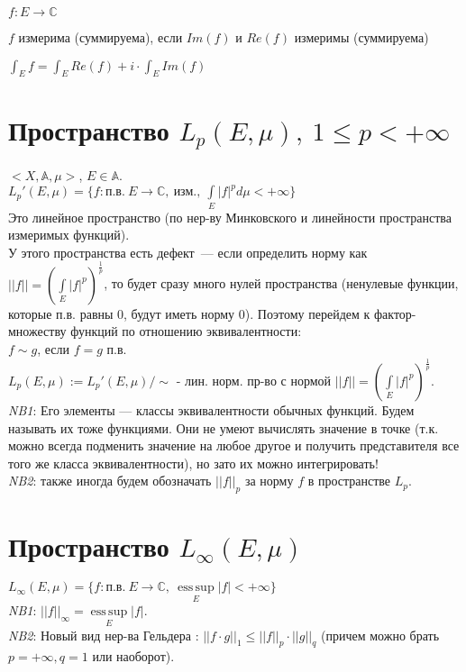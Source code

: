 \documentclass[paper=a4, fontsize=14pt]{report}
\DeclareMathOperator*{\esssup}{ess\, sup}
\begin{document}
$f: E \rightarrow \mathds{C}$

$f$ измерима (суммируема), если $Im(f)$ и $Re(f)$ измеримы (суммируема)

$\int_E f =\int_E Re(f) + i \cdot \int_E Im(f) $ 

\section{Пространство $L_p(E,\mu),\ 1 \leq p < +\infty$}
$<X, \mathds{A}, \mu>$, $E \in \mathds{A}$.\\
$L_p'(E, \mu) = \{ f : \text{п.в.}\ E \rightarrow \mathbb{C},\ \text{изм.},\ \int\limits_E |f|^p d\mu < +\infty \}$\\
Это линейное пространство (по нер-ву Минковского и линейности пространства измеримых функций).\\
У этого пространства есть дефект~--- если определить норму как $||f|| = \left(\int\limits_E |f|^p\right)^\frac{1}{p}$, то будет сразу много нулей пространства (ненулевые функции, которые п.в. равны $0$, будут иметь норму $0$).
Поэтому перейдем к фактор-множеству функций по отношению эквивалентности:\\
$f \sim g$, если $f = g$ п.в.\\
$ L_p(E, \mu) := L_p'(E, \mu) / \sim$ - лин. норм. пр-во с нормой $||f|| = \left(\int\limits_E |f|^p\right)^\frac{1}{p}$.\\

\emph{NB1}: Его элементы --- классы эквивалентности обычных функций. Будем называть их тоже функциями. Они не умеют вычислять значение в точке (т.к. можно всегда подменить значение на любое другое и получить представителя все того же класса эквивалентности), но зато их можно интегрировать!\\

\emph{NB2}: также иногда будем обозначать $||f||_p$ за норму $f$ в пространстве $L_p$.

\section{Пространство $L_{\infty}(E,\mu)$}
$L_\infty(E, \mu) =\{f : \text{п.в.}\ E \rightarrow \mathbb{C},\ \esssup\limits_E |f| < +\infty \}$\\
\emph{NB1}: $||f||_\infty = \esssup\limits_E |f|$.\\

\emph{NB2}: Новый вид нер-ва Гельдера : $||f \cdot g||_1 \leq ||f||_p \cdot ||g||_q$ (причем можно брать $p = +\infty, q = 1$ или наоборот).
\end{document}
